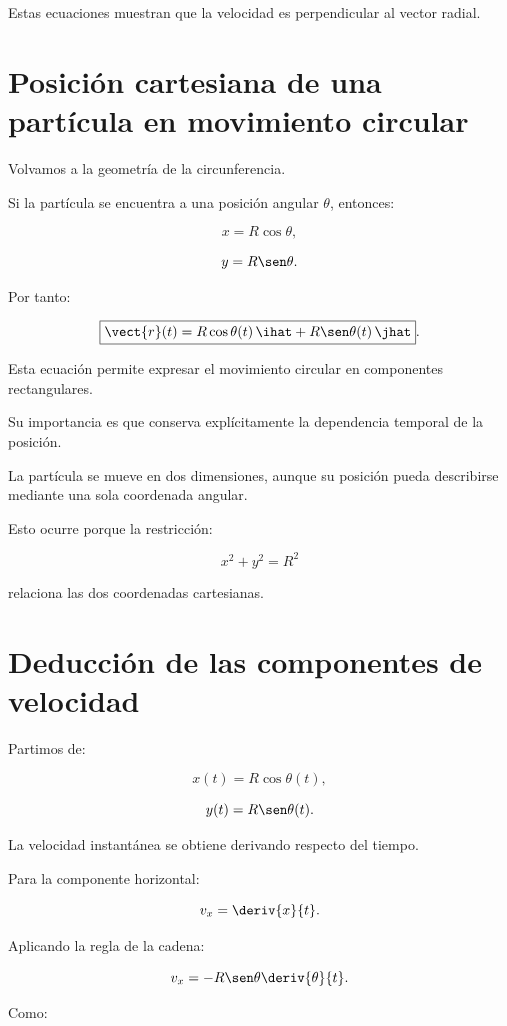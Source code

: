 Estas ecuaciones muestran que la velocidad es perpendicular al vector radial.


\section{Posición cartesiana de una partícula en movimiento circular}

Volvamos a la geometría de la circunferencia.

Si la partícula se encuentra a una posición angular \(\theta\), entonces:

\[
x=R\cos\theta,
\]

\[
y=R\sen\theta.
\]

Por tanto:

\[
\boxed{
\vect{r}(t)
=
R\cos\theta(t)\,\ihat
+
R\sen\theta(t)\,\jhat
}.
\]

Esta ecuación permite expresar el movimiento circular en componentes
rectangulares.

Su importancia es que conserva explícitamente la dependencia temporal de la
posición.

\begin{interpretacion}

La partícula se mueve en dos dimensiones, aunque su posición pueda describirse
mediante una sola coordenada angular.

Esto ocurre porque la restricción:

\[
x^2+y^2=R^2
\]

relaciona las dos coordenadas cartesianas.

\end{interpretacion}


\section{Deducción de las componentes de velocidad}

Partimos de:

\[
x(t)=R\cos\theta(t),
\]

\[
y(t)=R\sen\theta(t).
\]

La velocidad instantánea se obtiene derivando respecto del tiempo.

Para la componente horizontal:

\[
v_x=\deriv{x}{t}.
\]

Aplicando la regla de la cadena:

\[
v_x
=
-R\sen\theta
\deriv{\theta}{t}.
\]

Como:

